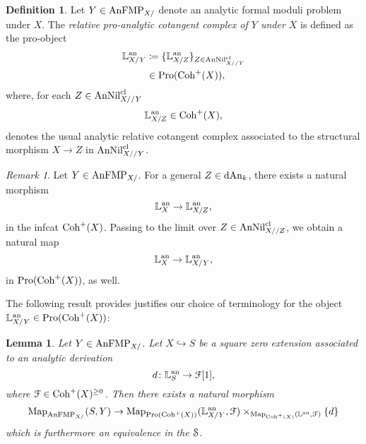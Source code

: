\documentclass[10pt,a4paper,reqno]{amsart} %
\theoremstyle{plain}
\newtheorem{lem}[thm]{Lemma}
\theoremstyle{definition}
\newtheorem{defin}[thm]{Definition}
\theoremstyle{remark}
\newtheorem{rem}[thm]{Remark}
\numberwithin{equation}{section}
\begin{document}
\begin{defin}
    Let $Y \in \mathrm{AnFMP}_{X/}$ denote an analytic formal moduli problem under $X$. The \emph{relative pro-analytic cotangent complex of $Y$ under $X$} is defined as the pro-object
        \begin{align*}
            \mathbb L^\mathrm{an}_{X/Y} &  \coloneqq \{ \mathbb L^\mathrm{an}_{X/Z} \}_{Z \in \mathrm{AnNil}^{\mathrm{cl}}_{X//Y}} \\
                          &  \in \mathrm{Pro}(\mathrm{Coh}^+(X)),
        \end{align*}
    where, for each $Z \in \mathrm{AnNil}^{\mathrm{cl}}_{X//Y}$
        \[\mathbb L^\mathrm{an}_{X/Z} \in \mathrm{Coh}^+(X),\]
    denotes the usual analytic relative cotangent complex associated to
    the structural morphism $X \to Z$ in $\mathrm{AnNil}^{\mathrm{cl}}_{X//Y}$.
\end{defin}




\begin{rem}
    Let $Y \in \mathrm{AnFMP}_{X/}$. For a general $Z \in \mathrm{dAn}_k$, there exists a natural morphism
        \[
            \mathbb L^\mathrm{an}_X \to \mathbb L^\mathrm{an}_{X/Z} ,  
        \]
    in the infcat $\mathrm{Coh}^+(X)$. Passing to the limit over $Z \in \mathrm{AnNil}^{\mathrm{cl}}_{X//Z}$, we obtain a natural map
        \[
            \mathbb L^\mathrm{an}_X \to \mathbb L^\mathrm{an}_{X/Y},  
        \]
    in $\mathrm{Pro}(\mathrm{Coh}^+(X))$, as well.
\end{rem}

The following result provides justifies our choice of terminology for the object $\mathbb L^\mathrm{an}_{X/Y} \in \mathrm{Pro}(\mathrm{Coh}^+(X))$:

\begin{lem} \label{lem:pro_cot_complex_classifies_nil_extensions_for_analytic_moduli_problems}
    Let $Y \in \mathrm{AnFMP}_{X/}$. Let $X \hookrightarrow S$ be a square zero extension associated to an analytic derivation
        \[
            d \colon \mathbb L^\mathrm{an}_S \to \mathcal F [1] ,  
        \]
    where $\mathcal F \in \mathrm{Coh}^+(X)^{\ge 0}$. Then there exists a natural morphism
        \[
            \operatorname{Map}_{\mathrm{AnFMP}_{X/}}(S, Y) \to \operatorname{Map}_{\mathrm{Pro}(\mathrm{Coh}^+(X))}(\mathbb L^\mathrm{an}_{X/Y}, \mathcal F) \times_{\operatorname{Map}_{\mathrm{Coh}^+(X)}(\mathbb L^\mathrm{an}, \mathcal F)} \{ d \}
        \]
    which is furthermore an equivalence in the \infcat $\mathcal S$.
\end{lem}
\end{document}
